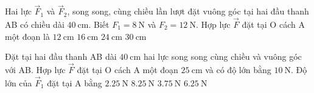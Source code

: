 \begin{ex}
	Hai lực $\vec{F}_1$ và $\vec{F}_2$, song song, cùng chiều lần lượt đặt vuông góc tại hai đầu thanh AB có chiều dài $\SI{40}{\centi\meter}$. Biết $F_1=\SI{8}{\newton}$ và $F_2=\SI{12}{\newton}$. Hợp lực $\vec F$ đặt tại O cách A một đoạn là
	\choice
	{$\SI{12}{\centi\meter}$}
	{$\SI{16}{\centi\meter}$}
	{\True $\SI{24}{\centi\meter}$}
	{$\SI{30}{\centi\meter}$}
\end{ex}
\begin{ex}
	Đặt tại hai đầu thanh AB dài $\SI{40}{\centi\meter}$ hai lực song song cùng chiều và vuông góc với AB. Hợp lực $\vec{F}$ đặt tại O cách A một đoạn $\SI{25}{\centi\meter}$ và có độ lớn bằng $\SI{10}{\newton}$. Độ lớn của $\vec{F}_1$ đặt tại A bằng
	\choice
	{$\SI{2.25}{\newton}$}
	{$\SI{8.25}{\newton}$}
	{\True $\SI{3.75}{\newton}$}
	{$\SI{6.25}{\newton}$}
\end{ex}
